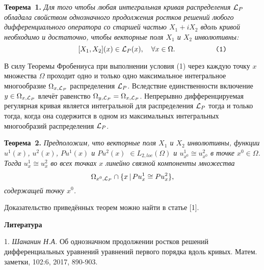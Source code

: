 \textbf{Теорема~1.} {\it Для того чтобы любая интегральная кривая распределения ${\cal L}_P$  обладала свойством однозначного продолжения ростков решений любого дифференциального оператора со старшей частью $X_1+iX_2$ вдоль кривой  необходимо и достаточно, чтобы векторные поля $X_1$ и $X_2$ инволютивны: $$\hspace{2cm} [X_1, X_2](x)\in  {\cal L}_P(x),\quad \forall x\in \Omega.\hspace{2cm}\verb"(1)"$$
}


В силу Теоремы Фробениуса при выполнении условия (1)  через каждую точку $x$ множества $\Omega$ проходит одно и только одно максимальное интегральное многообразие $\Omega_{x, {\cal L}_P}$ распределения ${\cal L}_P$. Вследствие единственности
 включение $y\in \Omega_{x, {\cal L}_P}$ влечёт равенство $\Omega_{y, {\cal L}_P}=\Omega_{x, {\cal L}_P}$. Непрерывно дифференцируемая
регулярная кривая является интегральной для распределения ${\cal L}_P$ тогда и только тогда, когда она содержится в одном из максимальных интегральных многообразий распределения ${\cal L}_P$.










\textbf{Теорема~2.} {\it Предположим, что векторные поля $X_1$ и $X_2$ инволютивны,
функции $u^1(x)$, $u^2(x)$, $Pu^1(x)$ и $Pu^2(x)$ $\in L_{2, loc}(\Omega)$ и    $u^1_{x^0}\cong u^2_{x^0}$ в  точке $x^0\in\Omega$.
Тогда $u^1_{x}\cong u^2_{x}$ во всех точках $x$ линейно связной компоненты множества
$$
\Omega_{x^0, {\cal L}_P}\cap\{x \,|\, Pu^1_{x}\cong Pu^2_x\},
$$
содержащей точку $x^0$.}

Доказательство приведённых теорем можно найти в статье  [1].



\smallskip \centerline{\bf Литература}\nopagebreak

1. {\it Шананин Н.А.} Об однозначном продолжении ростков  решений
дифференциальных уравнений уравнений  первого порядка  вдоль кривых. Матем. заметки, 102:6, 2017, 890-903.

